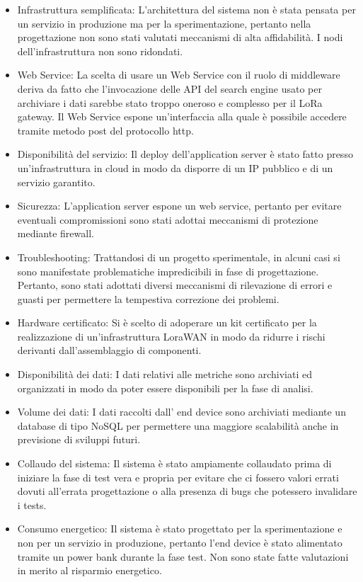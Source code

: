 \documentclass[12pt,a4paper,openright,twoside]{report}
\begin{document}
\begin{itemize}                       
\item Infrastruttura semplificata: L'architettura del sistema non \`e stata pensata per un servizio in produzione ma per la sperimentazione, pertanto nella progettazione non sono stati valutati meccanismi di alta affidabilit\`a. I nodi dell'infrastruttura non sono ridondati. 
\item Web Service: La scelta di usare un Web Service con il ruolo di middleware deriva da fatto che l'invocazione delle API del search engine usato per archiviare i dati sarebbe stato troppo oneroso e complesso per il LoRa gateway. Il Web Service espone un'interfaccia alla quale  \`e possibile accedere tramite metodo post del protocollo http. 
\item Disponibilit\`a del servizio: Il deploy dell'application server \`e stato fatto presso un'infrastruttura in cloud in modo da disporre di un IP pubblico e di un servizio garantito. 
\item Sicurezza: L'application server espone un web service, pertanto per evitare eventuali compromissioni sono stati adottai meccanismi di protezione mediante firewall.
\item Troubleshooting: Trattandosi di un progetto sperimentale, in alcuni casi si sono manifestate problematiche impredicibili in fase di progettazione. Pertanto, sono stati adottati diversi meccanismi di rilevazione di errori e guasti per permettere la tempestiva correzione dei problemi.
\item Hardware certificato: Si \`e scelto di adoperare un kit certificato per la realizzazione di un'infrastruttura LoraWAN in modo da ridurre i rischi derivanti dall'assemblaggio di componenti. 
\item Disponibilit\`a dei dati: I dati relativi alle metriche sono archiviati ed organizzati in modo da poter essere disponibili per la fase di analisi.
\item Volume dei dati: I dati raccolti dall' end device sono archiviati mediante un database di tipo NoSQL per permettere una maggiore scalabilit\`a anche in previsione di sviluppi futuri.
\item Collaudo del sistema: Il sistema \`e stato ampiamente collaudato prima di iniziare la fase di test vera e propria per evitare che ci fossero valori errati dovuti all'errata progettazione o alla presenza di bugs che potessero invalidare i tests.
\item Consumo energetico: Il sistema \`e stato progettato per la sperimentazione e non per un servizio in produzione, pertanto l'end device \`e stato alimentato tramite un power bank durante la fase test. Non sono state fatte valutazioni in merito al risparmio energetico.

\end{itemize}
\end{document}
